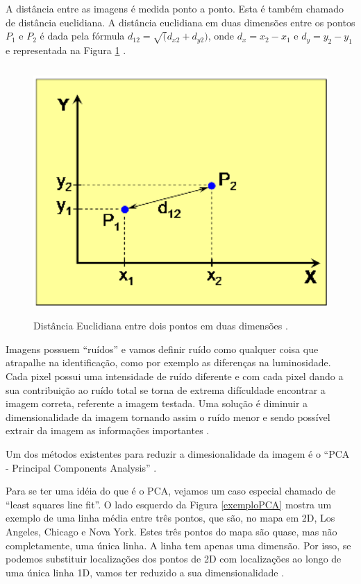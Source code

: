 A distância entre as imagens é medida ponto a ponto. Esta é também chamado de distância euclidiana. A distância euclidiana em duas dimensões entre os pontos $P_1$ e $P_2$ é dada pela fórmula $\displaystyle d_{12} = \sqrt(d_{x2} + d_{y2})$, onde $\displaystyle d_x = x_2 - x_1$ e $\displaystyle d_y = y_2-y_1$ e representada na Figura \ref{distanciaEntrePontos} \cite{hewitt}.

    \begin{figure}[hbt]
		\begin{center}
			\includegraphics[height=9.5cm,width=12.5cm]{figuras/2.FundamentacaoTeorica/graficoDistanciaEntrePontos.png}
		\end{center}
		\caption{Distância Euclidiana entre dois pontos em duas dimensões \cite{hewitt}.}
		\label{distanciaEntrePontos}
	\end{figure}


Imagens possuem ``ruídos'' e vamos definir ruído como qualquer coisa que atrapalhe na identificação, como por exemplo as diferenças na luminosidade. Cada pixel possui uma intensidade de ruído diferente e com cada pixel dando a sua contribuição ao ruído total se torna de extrema difículdade encontrar a imagem correta, referente a imagem testada. Uma solução é diminuir a dimensionalidade da imagem tornando assim o ruído menor e sendo possível extrair da imagem as informações importantes \cite{hewitt}.

Um dos métodos existentes para reduzir a dimesionalidade da imagem é o ``PCA - Principal Components Analysis'' \cite{hewitt}.

Para se ter uma idéia do que é o PCA, vejamos um caso especial chamado de ``least squares line fit''. O lado esquerdo da Figura \ref{exemploPCA} mostra um exemplo de uma linha média entre três pontos, que são, no mapa em 2D, Los Angeles, Chicago e Nova York. Estes três pontos do mapa são quase, mas não completamente, uma única linha. A linha tem apenas uma dimensão. Por isso, se podemos substituir localizações dos pontos de 2D com localizações ao longo de uma única linha 1D, vamos ter reduzido a sua dimensionalidade \cite{hewitt}.

